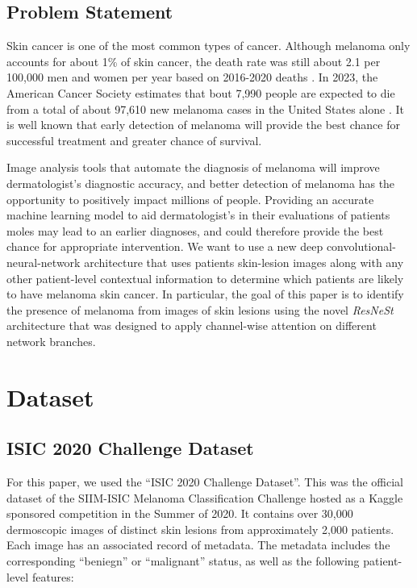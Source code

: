 \documentclass [MAS] {uclathes}
\begin{document}
\section{Problem Statement}

Skin cancer is one of the most common types of cancer. Although melanoma only accounts for about 1\% of skin cancer, the death rate was still about 2.1 per 100,000 men and women per year based on 2016-2020 deaths \cite{SEER}. In 2023, the American Cancer Society estimates that bout 7,990 people are expected to die from a total of about 97,610 new melanoma cases in the United States alone \cite{ACS}. It is well known that early detection of melanoma will provide the best chance for successful treatment and greater chance of survival. 

Image analysis tools that automate the diagnosis of melanoma will improve dermatologist's diagnostic accuracy, and better detection of melanoma has the opportunity to positively impact millions of people. Providing an accurate machine learning model to aid dermatologist's in their evaluations of patients moles may lead to an earlier diagnoses, and could therefore provide the best chance for appropriate intervention. We want to use a new deep convolutional-neural-network architecture that uses patients skin-lesion images along with any other patient-level contextual information to determine which patients are likely to have melanoma skin cancer. In particular, the goal of this paper is to identify the presence of melanoma from images of skin lesions using the novel \textit{ResNeSt} architecture that was designed to apply channel-wise attention on different network branches.


\chapter{Dataset}

\section{ISIC 2020 Challenge Dataset}

For this paper, we used the ``ISIC 2020 Challenge Dataset''. This was the official dataset of the SIIM-ISIC Melanoma Classification Challenge hosted as a Kaggle sponsored competition in the Summer of 2020. It contains over 30,000 dermoscopic images of distinct skin lesions from approximately 2,000 patients. Each image has an associated record of metadata. The metadata includes the corresponding ``beniegn'' or ``malignant'' status, as well as the following patient-level features: 
\end{document}

